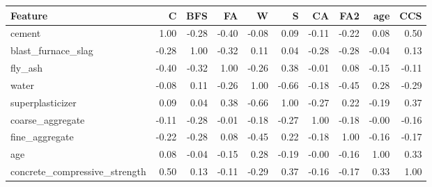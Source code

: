 \begin{tabular}{lrrrrrrrrr}
\toprule
Feature & C & BFS & FA & W & S & CA & FA2 & age & CCS \\
\midrule
cement & 1.00 & -0.28 & -0.40 & -0.08 & 0.09 & -0.11 & -0.22 & 0.08 & 0.50 \\
blast\_furnace\_slag & -0.28 & 1.00 & -0.32 & 0.11 & 0.04 & -0.28 & -0.28 & -0.04 & 0.13 \\
fly\_ash & -0.40 & -0.32 & 1.00 & -0.26 & 0.38 & -0.01 & 0.08 & -0.15 & -0.11 \\
water & -0.08 & 0.11 & -0.26 & 1.00 & -0.66 & -0.18 & -0.45 & 0.28 & -0.29 \\
superplasticizer & 0.09 & 0.04 & 0.38 & -0.66 & 1.00 & -0.27 & 0.22 & -0.19 & 0.37 \\
coarse\_aggregate & -0.11 & -0.28 & -0.01 & -0.18 & -0.27 & 1.00 & -0.18 & -0.00 & -0.16 \\
fine\_aggregate & -0.22 & -0.28 & 0.08 & -0.45 & 0.22 & -0.18 & 1.00 & -0.16 & -0.17 \\
age & 0.08 & -0.04 & -0.15 & 0.28 & -0.19 & -0.00 & -0.16 & 1.00 & 0.33 \\
concrete\_compressive\_strength & 0.50 & 0.13 & -0.11 & -0.29 & 0.37 & -0.16 & -0.17 & 0.33 & 1.00 \\
\bottomrule
\end{tabular}